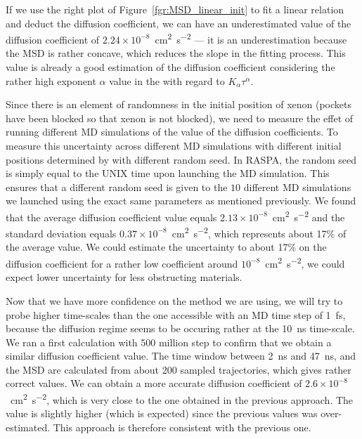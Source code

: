 \documentclass[main]{subfiles}
\begin{document}
If we use the right plot of Figure~\ref{fgr:MSD_linear_init} to fit a linear relation and deduct the diffusion coefficient, we can have an underestimated value of the diffusion coefficient of $2.24\times 10^{-8}$~\si{\square\cm\per\square\s} --- it is an underestimation because the MSD is rather concave, which reduces the slope in the fitting process. This value is already a good estimation of the diffusion coefficient considering the rather high exponent $\alpha$ value in the with regard to $K_\alpha\tau^\alpha$.

Since there is an element of randomness in the initial position of xenon (pockets have been blocked so that xenon is not blocked), we need to measure the effet of running different MD simulations of the value of the diffusion coefficients. To measure this uncertainty across different MD simulations with different initial positions determined by with different random seed. In RASPA, the random seed is simply equal to the UNIX time upon launching the MD simulation. This ensures that a different random seed is given to the $10$ different MD simulations we launched using the exact same parameters as mentioned previously. We found that the average diffusion coefficient value equals $2.13\times 10^{-8}$~\si{\square\cm\per\square\s} and the standard deviation equals $0.37\times 10^{-8}$~\si{\square\cm\per\square\s}, which represents about {17\%} of the average value. We could estimate the uncertainty to about {17\%} on the diffusion coefficient for a rather low coefficient around $10^{-8}$~\si{\square\cm\per\square\s}, we could expect lower uncertainty for less obstructing materials. 

Now that we have more confidence on the method we are using, we will try to probe higher time-scales than the one accessible with an MD time step of \SI{1}{\fs}, because the diffusion regime seems to be occuring rather at the \SI{10}{\ns} time-scale. We ran a first calculation with 500 million step to confirm that we obtain a similar diffusion coefficient value. The time window between \SI{2}{\ns} and \SI{47}{\ns}, and the MSD are calculated from about 200 sampled trajectories, which gives rather correct values. We can obtain a more accurate diffusion coefficient of $2.6\times 10^{-8}$~\si{\square\cm\per\square\s}, which is very close to the one obtained in the previous approach. The value is slightly higher (which is expected) since the previous values was over-estimated. This approach is therefore consistent with the previous one.
\end{document}
